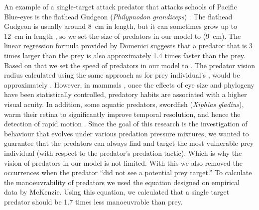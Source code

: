 An example of a single-target attack predator that attacks schools of Pacific Blue-eyes is the flathead Gudgeon (\emph{Philypnodon grandiceps}) \cite{herbertread2016threedimensional}. The flathead Gudgeon is usually around \SI{8}{\cm} in length, but it can sometimes grow up to \SI{12}{\cm} in length \cite{pusey2004freshwater}, so we set the size of \ST predators in our model to  (\SI{9}{\cm}). The linear regression formula provided by Domenici \cite{domenici2001scaling} suggests that a predator that is 3 times larger than the prey is also approximately \num{1.4} times faster than the prey. Based on that we set the speed of \ST predators in our model to . The \ST predator vision radius calculated using the same approach as for prey individual's \cite{hairston1982fish,pita2015vision,tyrrell2013looking}, would be approximately . However, in mammals \cite{veilleux2014visual}, once the effects of eye size and phylogeny have been statistically controlled, predatory habits are associated with a higher visual acuity. In addition, some aquatic predators, \eg swordfish (\emph{Xiphias gladius}), warm their retina to significantly improve temporal resolution, and hence the detection of rapid motion \cite{fritsches2005warm}. Since the goal of this research is the investigation of behaviour that evolves under various predation pressure mixtures, we wanted to guarantee that the predators can always find and target the most vulnerable prey individual (with respect to the predator's predation tactic). Which is why the vision of predators in our model is not limited. With this we also removed the occurrences when the predator ``did not see a potential prey target.'' To calculate the manoeuvrability of \ST predators we used the equation designed on empirical data by McKenzie\etal \cite{mckenzie2007locomotion}. Using this equation, we calculated that a single target predator should be \num{1.7} times less manoeuvrable than prey.

